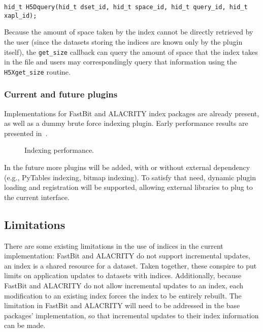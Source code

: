 {
\begin{lstlisting}
hid_t H5Dquery(hid_t dset_id, hid_t space_id, hid_t query_id, hid_t xapl_id);
\end{lstlisting}
}

Because the amount of space taken by the index cannot be directly retrieved by
the user (since the datasets storing the indices are known only by the plugin
itself), the \texttt{get\_size} callback can query the amount of space that
the index takes in the file and users may correspondingly query that information using the
\texttt{H5Xget\_size} routine.

\subsubsection{Current and future plugins}

Implementations for FastBit and ALACRITY index packages are already
present, as well as a dummy brute force indexing plugin. Early performance results
are presented in~.

\begin{figure}

\caption{Indexing performance.}
\label{fig:indexing_perf}
\vspace{-20pt}
\end{figure}

In the future more plugins will be added, with or without external dependency
(e.g., PyTables indexing, bitmap indexing).
To satisfy that need, dynamic plugin loading and registration will be supported,
allowing external libraries to plug to the current interface.

\subsection{Limitations}

There are some existing limitations in the use of indices in the current
implementation: FastBit and ALACRITY do not support incremental updates,
an index is a shared resource for a dataset. Taken together, these conspire to
put limits on application updates to datasets with indices.
Additionally, because FastBit and ALACRITY do not allow incremental updates to
an index, each modification to an existing index forces the index to be entirely
rebuilt. The limitation in FastBit and ALACRITY will need to be addressed in
the base packages' implementation, so that incremental updates
to their index information can be made.

